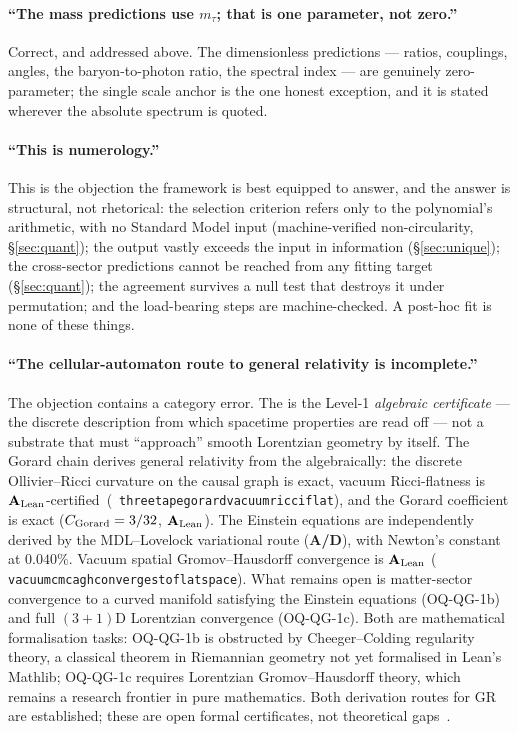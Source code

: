\documentclass[11pt]{article}
\newcommand{\CMCA}{\text{CMCA}}
\newcommand{\lean}[1]{%
  \penalty-100
  \begingroup\def\_{\textunderscore\allowbreak}\texttt{#1}\endgroup}
\newcommand{\CatAL}{\ensuremath{\textbf{A}_{\rm Lean}}}
\newcommand{\CatAD}{\textbf{A/D}}
\begin{document}
\paragraph{``The mass predictions use $m_\tau$; that is one parameter, not zero.''}
Correct, and addressed above.  The dimensionless predictions --- ratios, couplings,
angles, the baryon-to-photon ratio, the spectral index --- are genuinely
zero-parameter; the single scale anchor is the one honest exception, and it is
stated wherever the absolute spectrum is quoted.

\paragraph{``This is numerology.''}  This is the objection the framework is best
equipped to answer, and the answer is structural, not rhetorical: the selection
criterion refers only to the polynomial's arithmetic, with no Standard Model input
(machine-verified non-circularity, §\ref{sec:quant}); the output vastly exceeds the
input in information (§\ref{sec:unique}); the cross-sector predictions cannot be
reached from any fitting target (§\ref{sec:quant}); the agreement survives a null
test that destroys it under permutation; and the load-bearing steps are
machine-checked.  A post-hoc fit is none of these things.

\paragraph{``The cellular-automaton route to general relativity is incomplete.''}
The objection contains a category error.  The \CMCA{} is the Level-1
\emph{algebraic certificate} --- the discrete description from which spacetime
properties are read off --- not a substrate that must ``approach'' smooth
Lorentzian geometry by itself.  The Gorard chain derives general relativity
from the \CMCA{} algebraically: the discrete Ollivier--Ricci curvature on the
\CMCA{} causal graph is exact, vacuum Ricci-flatness is
\CatAL-certified~\mbox{(\lean{three\_tape\_gorard\_vacuum\_ricci\_flat})}, and
the Gorard coefficient is exact ($C_{\rm Gorard} = 3/32$, \CatAL).  The Einstein
equations are independently derived by the MDL--Lovelock variational route
(\CatAD), with Newton's constant at $0.040\%$.  Vacuum spatial Gromov--Hausdorff convergence is \CatAL{}
(\lean{vacuum\_cmca\_gh\_converges\_to\_flat\_space}). What remains open is matter-sector
convergence to a curved manifold satisfying the Einstein equations (OQ-QG-1b) and full
$(3{+}1)$D Lorentzian convergence (OQ-QG-1c). Both are mathematical formalisation tasks: OQ-QG-1b is obstructed by
Cheeger--Colding regularity theory, a classical theorem in Riemannian geometry not yet
formalised in Lean's Mathlib; OQ-QG-1c requires Lorentzian Gromov--Hausdorff theory,
which remains a research frontier in pure mathematics.  Both derivation routes for GR
are established; these are open formal certificates, not theoretical
gaps~\cite{SpivackThreeTapeCMCA,SpivackGTECompleteFramework}.
\end{document}
